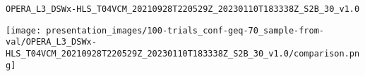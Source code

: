 
\begin{frame}[fragile]
\frametitle{}
\begin{verbatim}OPERA_L3_DSWx-HLS_T04VCM_20210928T220529Z_20230110T183338Z_S2B_30_v1.0 \end{verbatim}
\begin{center}
\tiny
\texttt{[image: presentation\_images/100-trials\_conf-geq-70\_sample-from-val/OPERA\_L3\_DSWx-HLS\_T04VCM\_20210928T220529Z\_20230110T183338Z\_S2B\_30\_v1.0/comparison.png]}



\end{center}
\end{frame}
